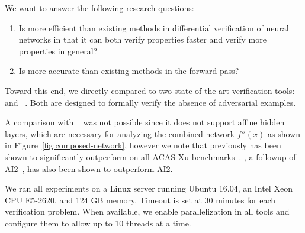 We want to answer the following research questions:
\begin{enumerate}
\item Is \diffNN{} more efficient than existing methods in differential verification of neural networks
		in that it can both verify properties faster and verify more properties in general?
\item Is \diffNN{} more accurate than existing methods in the forward pass?
\end{enumerate}
%
%
Toward this end, we directly compared \diffNN{} to two
state-of-the-art verification tools: \ReluVal{}~\cite{WangPWYJ18}
and \DeepPoly{}~\cite{SinghGPV19}. Both are designed to
formally verify the absence of adversarial examples.


A comparison with \Reluplex{}~\cite{KatzBDJK17} was not possible since
it does not support affine hidden layers, which are necessary for
analyzing the combined network $f''(x)$ as shown in Figure~\ref{fig:composed-network}, however we note
that \ReluVal{} previously has been shown to significantly outperform \Reluplex{} on
all ACAS Xu benchmarks~\cite{WangPWYJ18}.
%
\DeepPoly{},  a followup of \textsc{AI2}~\cite{GehrMDTCV18}, has also
been shown to outperform \textsc{AI2}.
%


We ran all experiments on a Linux server running Ubuntu 16.04, an Intel Xeon CPU E5-2620, and 124 GB memory. Timeout is set at 30 minutes for each verification
problem.  When available, we enable parallelization in all tools and
configure them to allow up to 10 threads at a time.

